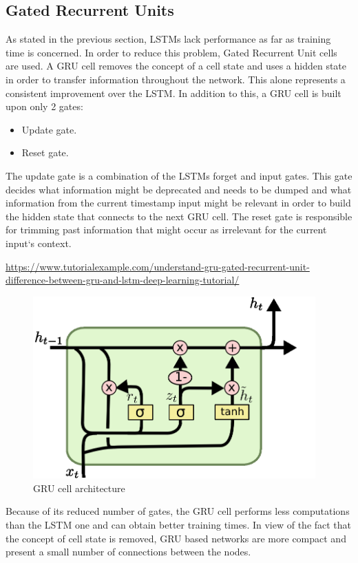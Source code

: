 \documentclass[12pt,a4paper]{report}
\begin{document}
\subsection{Gated Recurrent Units}
As stated in the previous section, LSTMs lack performance as far as training time is concerned. In order to reduce this problem, Gated Recurrent Unit cells are used. A GRU cell removes the concept of a cell state and uses a hidden state in order to transfer information throughout the network. This alone represents a consistent improvement over the LSTM. In addition to this, a GRU cell is built upon only 2 gates:
\begin{itemize}
    \item Update gate.
    \item Reset gate.
\end{itemize}
The update gate is a combination of the LSTMs forget and input gates. This gate decides what information might be deprecated and needs to be dumped and what information from the current timestamp input might be relevant in order to build the hidden state that connects to the next GRU cell. The reset gate is responsible for trimming past information that might occur as irrelevant for the current input`s context.

\urldef{\urlGRU}\url{https://www.tutorialexample.com/understand-gru-gated-recurrent-unit-difference-between-gru-and-lstm-deep-learning-tutorial/}
\begin{figure}[H]
\centering
\includegraphics[height=7cm]{pics/GRU.png}
  \caption[GRU cell architecture]{GRU cell architecture \footnotemark}
  \label{fig:GRU}
\end{figure}
\footnotetext{\urlGRU}

Because of its reduced number of gates, the GRU cell performs less computations than the LSTM one and can obtain better training times. In view of the fact that the concept of cell state is removed, GRU based networks are more compact and present a small number of connections between the nodes.
\end{document}

